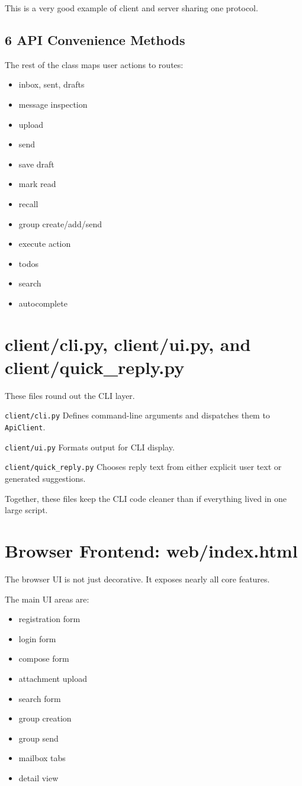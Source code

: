 \documentclass[11pt,a4paper]{article}
\begin{document}
This is a very good example of client and server sharing one protocol.

\subsection{6 API Convenience Methods}

The rest of the class maps user actions to routes:

\begin{itemize}
\item inbox, sent, drafts
\item message inspection
\item upload
\item send
\item save draft
\item mark read
\item recall
\item group create/add/send
\item execute action
\item todos
\item search
\item autocomplete
\end{itemize}


\section{client/cli.py, client/ui.py, and client/quick\_reply.py}

These files round out the CLI layer.

\nolinkurl{client/cli.py} Defines command-line arguments and dispatches them to \nolinkurl{ApiClient}.

\nolinkurl{client/ui.py} Formats output for CLI display.

\nolinkurl{client/quick_reply.py} Chooses reply text from either explicit user text or generated suggestions.

Together, these files keep the CLI code cleaner than if everything lived in one large script.


\section{Browser Frontend: web/index.html}

The browser UI is not just decorative. It exposes nearly all core features.

The main UI areas are:

\begin{itemize}
\item registration form
\item login form
\item compose form
\item attachment upload
\item search form
\item group creation
\item group send
\item mailbox tabs
\item detail view
\end{itemize}
\end{document}
